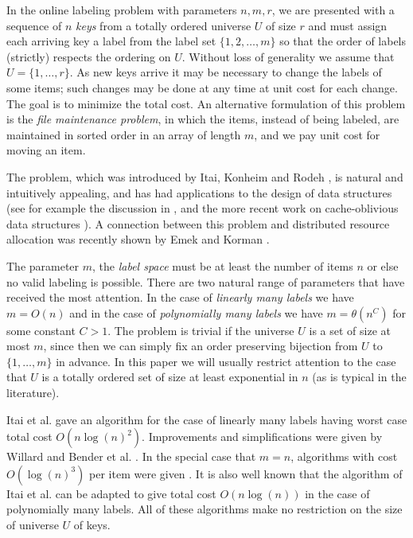 \documentclass[runningheads,a4paper]{llncs}
\begin{document}
In the online labeling problem with parameters $n,m,r$, 
we are presented with a sequence of $n$ {\em keys} from a totally ordered universe $U$ of size $r$
and must assign each arriving key a label from the label set $\{1,2,\dots,m\}$ so that the order of labels (strictly) respects the ordering on $U$.
Without loss of generality we assume that $U = \{1, \dots, r\}$.
As new keys arrive it may be necessary to change the labels of some items; such changes may be done at any time at unit cost
for each change.    
The goal is to minimize
the total cost.
An alternative formulation of this problem is
the \emph{file maintenance problem}, in which the items, instead of being labeled, 
are maintained in sorted order in an  array of length $m$, and we pay unit cost for moving an item. 

The problem, which was introduced by Itai, Konheim and Rodeh \cite{Itaietal}, 
is natural and intuitively appealing, and has had applications to the design of data structures (see for example
the discussion in \cite{DSZ04}, and the more recent work on cache-oblivious data structures 
\cite{BenderetalB-Tree,Brodaletal,BDIW}).  A connection between this problem and distributed resource allocation
was recently shown by Emek and Korman \cite{EK11}.


The parameter $m$, the {\em label space} must be at least the number of items $n$ or else no valid labeling is possible.  
There are two natural range of parameters that have received the most attention. In the case of {\em linearly many labels} we have
$m=O(n)$ and in the case of {\em polynomially many labels} we have $m=\theta(n^{C})$ for some constant $C>1$.  
The problem is trivial if the universe $U$ is a set of size at most $m$, since then we can simply fix an order preserving
bijection from $U$ to $\{1,\ldots,m\}$ in advance.  In this paper we will usually restrict attention to the case that  $U$
is a totally ordered set of size at least exponential in $n$ (as is typical in the literature).  

Itai et al. \cite{Itaietal} gave an algorithm for the case of linearly many labels having worst case total cost 
$O(n \log(n)^2)$.  Improvements and simplifications were given by Willard \cite{Willard} and Bender et al. \cite{Benderetal}. 
In the special case that $m=n$, algorithms with cost $O(\log(n)^3)$ per item were given
\cite{Zhang,BirdSadnicki}.  It is also
well known that the  algorithm of Itai et al. can be adapted to give total cost $O(n \log(n))$ in the case
of polynomially many labels.  
All of these algorithms make no restriction on the size of
universe $U$ of keys.
\end{document}
